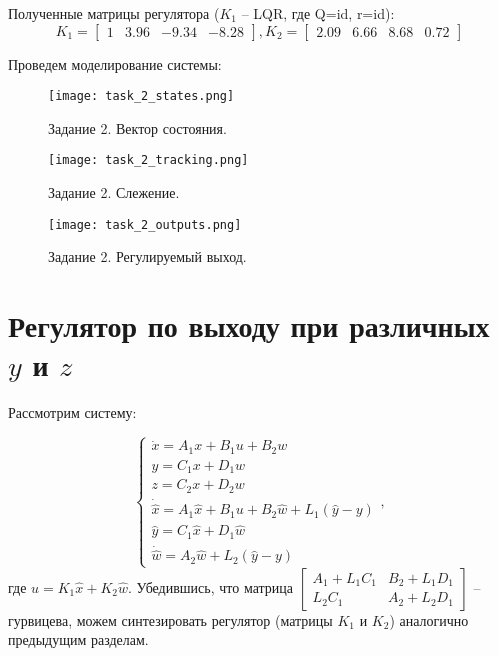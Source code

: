 Полученные матрицы регулятора ($K_1$ -- LQR, где Q=id, r=id):
\begin{equation*}
    K_1 = \begin{bmatrix}
        1 & 3.96 & -9.34 & -8.28
    \end{bmatrix},
    K_2 = \begin{bmatrix}
        2.09 & 6.66 & 8.68 & 0.72
    \end{bmatrix}
\end{equation*}

Проведем моделирование системы:

\begin{figure}[h]
    \centering
    \texttt{[image: task\_2\_states.png]}
    \caption{\label{fig:task4_3_2}Задание 2. Вектор состояния.}
\end{figure}

\begin{figure}[]
    \centering
    \texttt{[image: task\_2\_tracking.png]}
    \caption{\label{fig:task4_3_2}Задание 2. Слежение.}
\end{figure}

\begin{figure}[]
    \centering
    \texttt{[image: task\_2\_outputs.png]}
    \caption{\label{fig:task4_3_2}Задание 2. Регулируемый выход.}
\end{figure}
\pagebreak

\section{Регулятор по выходу при различных $y$ и $z$}

Рассмотрим систему:

\begin{equation}
    \begin{cases}
        \dot{x} = A_1x + B_1u + B_2w \\
        y = C_1x + D_1w \\
        z = C_2x + D_2w \\
        \dot{\hat{x}} = A_1\hat{x} + B_1u + B_2\hat{w} + L_1(\hat{y} - y) \\
        \hat{y} = C_1\hat{x} + D_1\hat{w} \\
        \dot{\hat{w}} = A_2\hat{w} + L_2(\hat{y} - y)
    \end{cases},
\end{equation}
где $u = K_1\hat{x} + K_2\hat{w}$. Убедившись, что матрица
$\begin{bmatrix}
    A_1 + L_1C_1 & B_2 + L_1D_1 \\
    L_2C_1 & A_2 + L_2D_1
\end{bmatrix}$ -- гурвицева, можем синтезировать регулятор (матрицы $K_1$ и $K_2$) аналогично предыдущим разделам.

